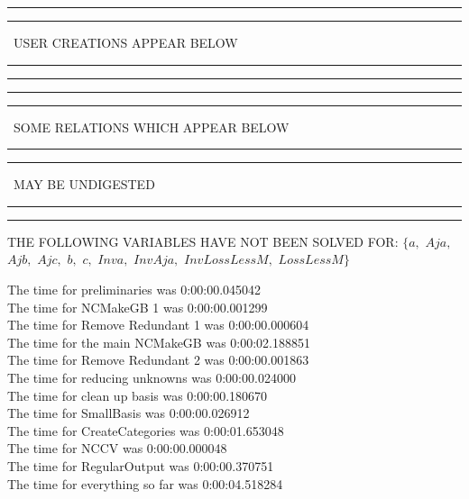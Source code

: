 \documentclass[rep10,leqno]{report}
\begin{document}
\rule[2pt]{6in}{1pt}\hfil\break
\rule[2.5pt]{1.701in}{1pt}
\ USER CREATIONS APPEAR BELOW\ 
\rule[2.5pt]{1.701in}{1pt}\hfil\break
\rule[2pt]{6in}{1pt}\hfil\break
\rule[2pt]{6in}{4pt}\hfil\break
\rule[2pt]{1.45in}{4pt}
\ SOME RELATIONS WHICH APPEAR BELOW\ 
\rule[2pt]{1.45in}{4pt}\hfil\break
\rule[2pt]{2.18in}{4pt}
\ MAY BE UNDIGESTED\ 
\rule[2pt]{2.18in}{4pt}\hfil\break
\rule[2pt]{6in}{4pt}\hfil\break
THE FOLLOWING VARIABLES HAVE NOT BEEN SOLVED FOR:\hfil\break
$\{a,
$ $
Aja,
$ $
Ajb,
$ $
Ajc,
$ $
b,
$ $
c,
$ $
Inva,
$ $
InvAja,
$ $
InvLossLessM,
$ $
LossLessM\}$
\smallskip\\
\vspace{10pt}

\noindent
The time for preliminaries was 0:00:00.045042\\
The time for NCMakeGB 1 was 0:00:00.001299\\
The time for Remove Redundant 1 was 0:00:00.000604\\
The time for the main NCMakeGB was 0:00:02.188851\\
The time for Remove Redundant 2 was 0:00:00.001863\\
The time for reducing unknowns was 0:00:00.024000\\
The time for clean up basis was 0:00:00.180670\\
The time for SmallBasis was 0:00:00.026912\\
The time for CreateCategories was 0:00:01.653048\\
The time for NCCV was 0:00:00.000048\\
The time for RegularOutput was 0:00:00.370751\\
The time for everything so far was 0:00:04.518284\\
\end{document}
